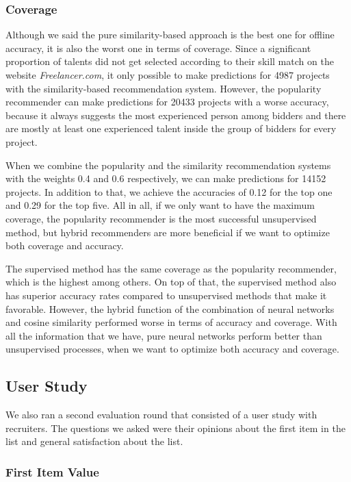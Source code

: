 \subsubsection{Coverage}

Although we said the pure similarity-based approach is the best one for offline accuracy, it is also the worst one in terms of coverage. Since a significant proportion of talents did not get selected according to their skill match on the website \textit{Freelancer.com}, it only possible to make predictions for 4987 projects with the similarity-based recommendation system. However, the popularity recommender can make predictions for 20433 projects with a worse accuracy, because it always suggests the most experienced person among bidders and there are mostly at least one experienced talent inside the group of bidders for every project.

When we combine the popularity and the similarity recommendation systems with the weights 0.4 and 0.6 respectively, we can make predictions for 14152 projects. In addition to that,  we achieve the accuracies of 0.12 for the top one and 0.29 for the top five. All in all, if we only want to have the maximum coverage, the popularity recommender is the most successful unsupervised method, but hybrid recommenders are more beneficial if we want to optimize both coverage and accuracy.

The supervised method has the same coverage as the popularity recommender, which is the highest among others. On top of that, the supervised method also has superior accuracy rates compared to unsupervised methods that make it favorable. However, the hybrid function of the combination of neural networks and cosine similarity performed worse in terms of accuracy and coverage. With all the information that we have, pure neural networks perform better than unsupervised processes, when we want to optimize both accuracy and coverage.

\subsection{User Study}

We also ran a second evaluation round that consisted of a user study with recruiters. The questions we asked were their opinions about the first item in the list and general satisfaction about the list.

\subsubsection{First Item Value}

